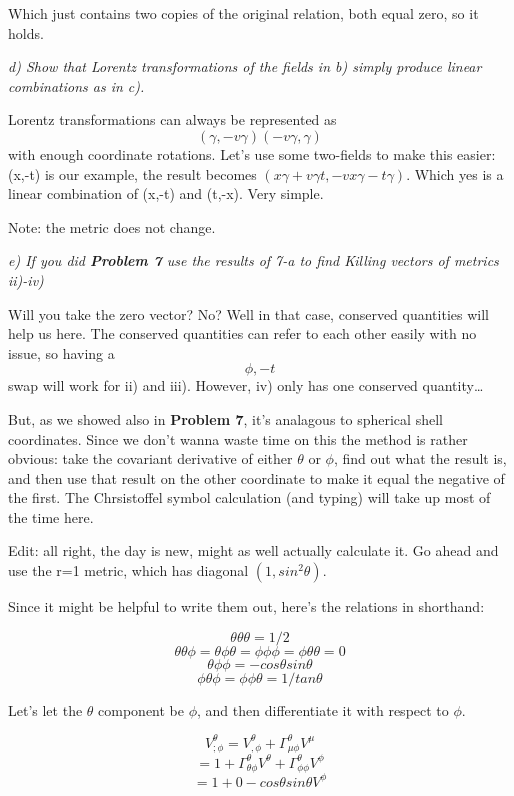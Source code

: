 \documentclass[landscape,letterpaper,10pt,english]{article}
\begin{document}
Which just contains two copies of the original relation, both equal
zero, so it holds.

    \emph{d) Show that Lorentz transformations of the fields in b) simply
produce linear combinations as in c).}

    Lorentz transformations can always be represented as
\[(\gamma, -v\gamma) (-v\gamma, \gamma)\] with enough coordinate
rotations. Let's use some two-fields to make this easier: (x,-t) is our
example, the result becomes
\((x\gamma + v\gamma t, -vx\gamma - t\gamma)\). Which yes is a linear
combination of (x,-t) and (t,-x). Very simple.

Note: the metric does not change.

    \emph{e) If you did \textbf{Problem 7} use the results of 7-a to find
Killing vectors of metrics ii)-iv)}

    Will you take the zero vector? No? Well in that case, conserved
quantities will help us here. The conserved quantities can refer to each
other easily with no issue, so having a \[\phi , -t\] swap will work for
ii) and iii). However, iv) only has one conserved quantity\ldots{}

But, as we showed also in \textbf{Problem 7}, it's analagous to
spherical shell coordinates. Since we don't wanna waste time on this the
method is rather obvious: take the covariant derivative of either
\(\theta\) or \(\phi\), find out what the result is, and then use that
result on the other coordinate to make it equal the negative of the
first. The Chrsistoffel symbol calculation (and typing) will take up
most of the time here.

    Edit: all right, the day is new, might as well actually calculate it. Go
ahead and use the r=1 metric, which has diagonal \((1,sin^2\theta)\).

Since it might be helpful to write them out, here's the relations in
shorthand:

\[ \theta\theta\theta = 1/2 \]
\[ \theta\theta\phi = \theta\phi\theta = \phi\phi\phi = \phi\theta\theta = 0 \]
\[ \theta\phi\phi = -cos\theta sin\theta \]
\[ \phi\theta\phi = \phi\phi\theta = 1/tan\theta \]

    Let's let the \(\theta\) component be \(\phi\), and then differentiate
it with respect to \(\phi\).

\[ V^\theta_{;\phi} = V^\theta_{,\phi} + \Gamma^\theta_{\mu\phi} V^\mu \]
\[ = 1 + \Gamma^\theta_{\theta\phi} V^\theta + \Gamma^\theta_{\phi\phi} V^\phi \]
\[ = 1 + 0 - cos\theta sin\theta V^\phi \]
\end{document}

